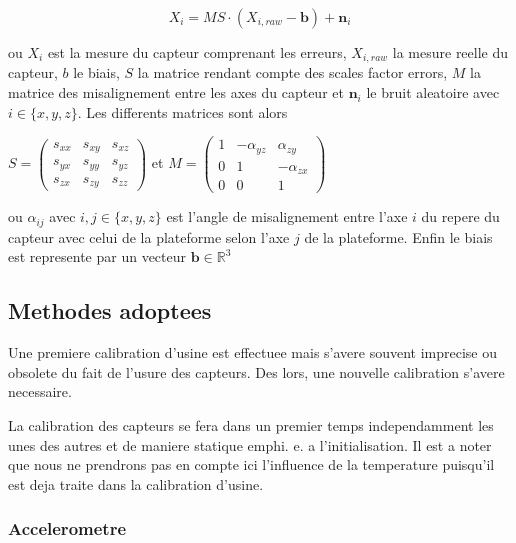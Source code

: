 \begin{equation}
	X_i = MS \cdot \left( X_{i,raw} - \textbf{b} \right) + \textbf{n}_i
\end{equation}


ou $X_i$ est la mesure du capteur comprenant les erreurs, $X_{i, raw}$ la mesure reelle du capteur,  $b$ le biais,  $S$ la matrice rendant compte des scales factor errors, $M$ la matrice des misalignement entre les axes du capteur et $\textbf{n}_i$ le bruit aleatoire avec $i \in \{x,y,z\}$.
Les differents matrices sont alors \\

\begin{center}
$S = \begin{pmatrix}  	s_{xx} & s_{xy} & s_{xz} \\ s_{yx} & s_{yy} & s_{yz} \\s_{zx} & s_{zy} & s_{zz}  \end{pmatrix}$ 	
 et
 $M = \begin{pmatrix}  1 & -\alpha_{yz} & \alpha_{zy} \\  0 & 1 & -\alpha_{zx} \\  0 & 0 & 1 \end{pmatrix} $
\end{center} 

\vspace{0.2cm}

ou $\alpha_{ij}$ avec $i,j \in \{x,y,z\} $ est l'angle de misalignement entre l'axe $i$ du repere du capteur avec celui de la plateforme selon l'axe $j$ de la plateforme. Enfin le biais est represente par un vecteur $\textbf {b} \in \mathbb{R}^3$


\subsection{Methodes adoptees}

Une premiere calibration d'usine est effectuee mais s'avere souvent imprecise ou obsolete du fait de l'usure des capteurs. Des lors, une nouvelle calibration s'avere necessaire.

La calibration des capteurs se fera dans un premier temps independamment les unes des autres et de maniere statique emph{i. e.} a l'initialisation. Il est a noter que nous ne prendrons pas en compte ici l'influence de la temperature puisqu'il est deja traite dans la calibration d'usine.

\subsubsection{Accelerometre}

